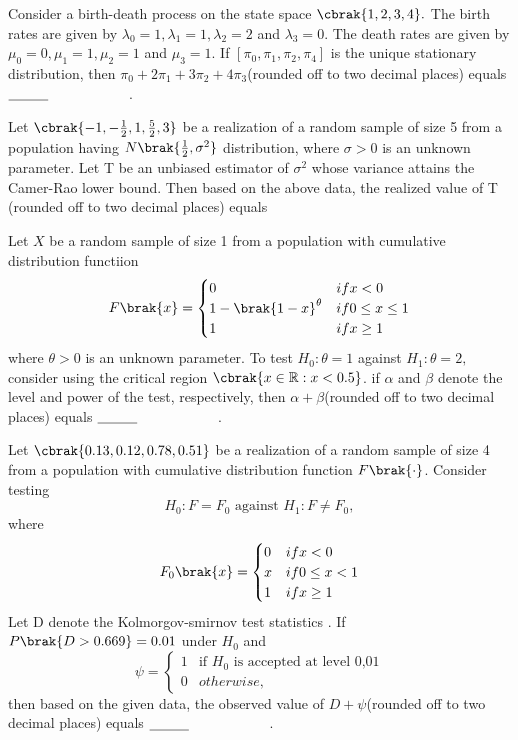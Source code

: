\item Consider a birth-death process on the state space $\cbrak{1,2,3,4}.$ The birth rates are given by $\lambda_0=1,\lambda_1=1,\lambda_2=2$ and $\lambda_3=0$. The death rates are given by $\mu_0=0,\mu_1=1,\mu_2=1$ and $\mu_3=1$. If $[\pi_0,\pi_1,\pi_2,\pi_4]$ is the unique stationary distribution, then $\pi_0+2\pi_1+3\pi_2+4\pi_3$(rounded off to two decimal places) equals $\makebox[3cm][l]{\underline{\hspace{1cm}}}$.
\item Let $\cbrak{-1,-\frac{1}{2},1,\frac{5}{2},3}$ be a realization of a random sample of size 5 from a population having $N\brak{\frac{1}{2},\sigma^2}$ distribution, where $\sigma>0$ is an unknown parameter. Let T be an unbiased estimator of $\sigma^2$ whose variance attains the Camer-Rao lower bound. Then based on the above data, the realized value of T (rounded off to two decimal places) equals
\item  Let $X$ be a random sample of size 1 from a population with cumulative distribution functiion \[
F\brak{x}=\begin{cases}
    0 &if x<0\\
    1-\brak{1-x}^\theta & if 0\leq x\leq1\\
    1 & if x\geq1
\end{cases}
\] 
where $\theta>0$ is an unknown parameter. To test $H_0:\theta=1$ against $H_1:\theta=2,$ consider using the critical region $\cbrak{x \in \mathbb{R}:x<0.5}$. if $\alpha$ and $\beta$ denote the level and power of the test, respectively, then $\alpha+\beta$(rounded off to two decimal places) equals $\makebox[3cm][l]{\underline{\hspace{1cm}}}$.
\item Let $\cbrak{0.13,0.12,0.78,0.51}$ be a realization of a random sample of size 4 from a population with cumulative distribution function $F\brak{\cdot}$. Consider testing $$H_0:F=F_0 \text{ against } H_1:F\neq F_0,$$ where \[
F_0\brak{x}=\begin{cases}
    0 & if x<0\\
    x & if 0\leq x <1\\
    1 & if x\geq1
\end{cases}
\]
Let D denote the Kolmorgov-smirnov test statistics . If $P\brak{D>0.669}=0.01$ under $H_0$ and \[
\psi=\begin{cases}
    1 & \text{if } H_0 \text{ is accepted at level 0,01}\\
    0 & otherwise,
\end{cases}
\]
then based on the given data, the observed value of $D+\psi$(rounded off to two decimal places) equals  $\makebox[3cm][l]{\underline{\hspace{1cm}}}$.

